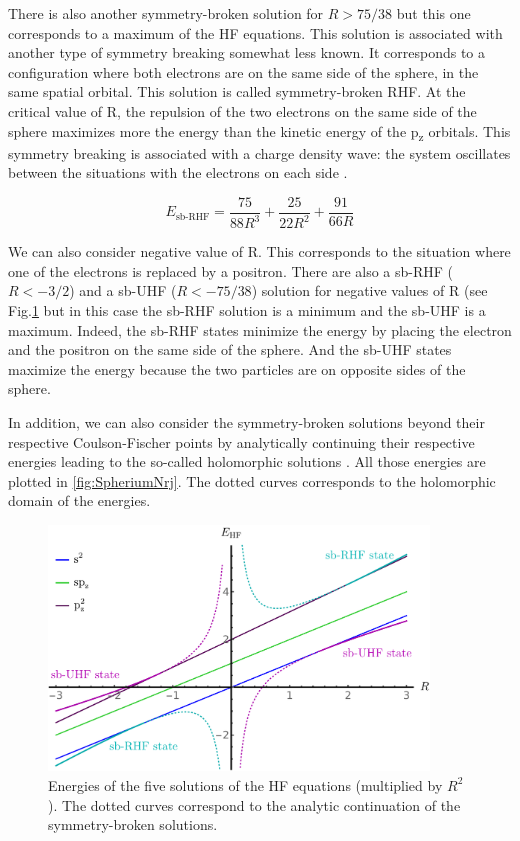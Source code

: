 \documentclass[11pt,a4paper]{article}
\begin{document}
There is also another symmetry-broken solution for $R>75/38$ but this one corresponds to a maximum of the HF equations. This solution is associated with another type of symmetry breaking somewhat less known. It corresponds to a configuration where both electrons are on the same side of the sphere, in the same spatial orbital. This solution is called symmetry-broken RHF. At the critical value of R, the repulsion of the two electrons on the same side of the sphere maximizes more the energy than the kinetic energy of the p\textsubscript{z} orbitals. This symmetry breaking is associated with a charge density wave: the system oscillates between the situations with the electrons on each side \cite{GiulianiBook}.

\begin{equation}
E_{\text{sb-RHF}}=\frac{75}{88R^3}+\frac{25}{22R^2}+\frac{91}{66R}
\end{equation}

We can also consider negative value of R. This corresponds to the situation where one of the electrons is replaced by a positron. There are also a sb-RHF ($R<-3/2$) and a sb-UHF ($R<-75/38$) solution for negative values of R (see Fig.\ref{fig:SpheriumNrj} but in this case the sb-RHF solution is a minimum and the sb-UHF is a maximum. Indeed, the sb-RHF states minimize the energy by placing the electron and the positron on the same side of the sphere. And the sb-UHF states maximize the energy because the two particles are on opposite sides of the sphere.

In addition, we can also consider the symmetry-broken solutions beyond their respective Coulson-Fischer points by analytically continuing their respective energies leading to the so-called holomorphic solutions \cite{Hiscock_2014, Burton_2019, Burton_2019a}. All those energies are plotted in \autoref{fig:SpheriumNrj}. The dotted curves corresponds to the holomorphic domain of the energies.

\begin{figure}[h!]
    \centering
    \includegraphics[width=0.9\textwidth]{EsbHF.pdf}
    \caption{\centering Energies of the five solutions of the HF equations (multiplied by $R^2$). The dotted curves correspond to the analytic continuation of the symmetry-broken solutions.}
    \label{fig:SpheriumNrj}
\end{figure}
\end{document}
